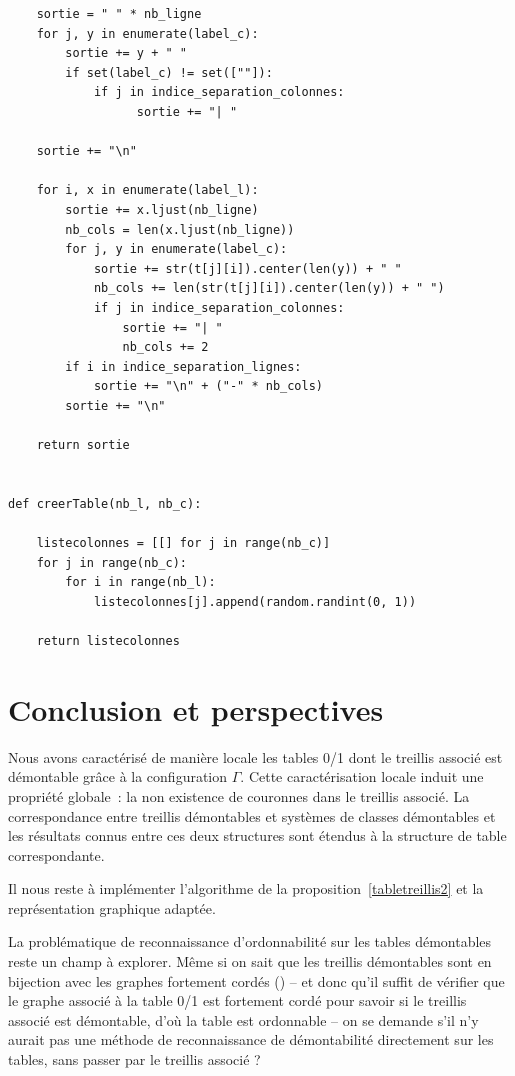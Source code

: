 \documentclass[a4paper]{report}
\begin{document}
\begin{lstlisting}
    sortie = " " * nb_ligne
    for j, y in enumerate(label_c):
        sortie += y + " "
        if set(label_c) != set([""]):
            if j in indice_separation_colonnes:
                  sortie += "| "
                  
    sortie += "\n"
    
    for i, x in enumerate(label_l):
        sortie += x.ljust(nb_ligne)
        nb_cols = len(x.ljust(nb_ligne))
        for j, y in enumerate(label_c):
            sortie += str(t[j][i]).center(len(y)) + " "
            nb_cols += len(str(t[j][i]).center(len(y)) + " ")
            if j in indice_separation_colonnes:
                sortie += "| "
                nb_cols += 2
        if i in indice_separation_lignes:
            sortie += "\n" + ("-" * nb_cols)
        sortie += "\n"
      
    return sortie
  

def creerTable(nb_l, nb_c):

    listecolonnes = [[] for j in range(nb_c)]
    for j in range(nb_c):
        for i in range(nb_l):
            listecolonnes[j].append(random.randint(0, 1))
      
    return listecolonnes

\end{lstlisting}

\chapter{Conclusion et perspectives}

\label{sccl}

Nous avons caractérisé de manière locale les tables 0/1 dont le treillis associé est démontable grâce à la configuration $\Gamma$.
Cette caractérisation locale induit une propriété globale~: la non existence de couronnes dans le treillis associé.
La correspondance entre treillis démontables et systèmes de classes démontables et les résultats connus entre ces deux structures sont 
étendus à la structure de table correspondante.

Il nous reste à implémenter l'algorithme de la proposition~\ref{tabletreillis2} et la représenta\-tion graphique adaptée.

La problématique de reconnaissance d'ordonnabilité sur les tables démonta\-bles reste un champ à explorer. Même si on sait que les treillis démonta\-bles sont en bijection avec les graphes 
fortement cordés (\cite{crow_free}) -- et donc qu'il suffit de vérifier que le graphe associé à la table 0/1 est fortement cordé pour savoir si le treillis associé 
est démontable, d'où la table est ordonnable -- on se demande s'il n'y aurait pas une méthode de reconnaissance de démontabilité directement sur les tables, 
sans passer par le treillis associé ?
\end{document}
